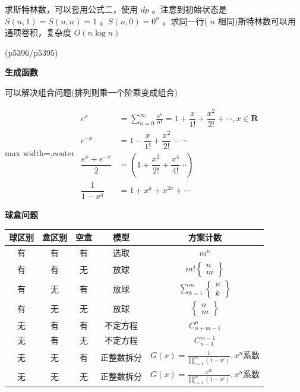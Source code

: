 \documentclass[twocolumn,10pt]{ctexart}
\makeatletter
\newcommand{\hfive}[1]{\par\addvspace{6pt}\@afterindentfalse
  {\noindent\bfseries\normalsize #1}\par\nobreak\vspace{2pt}}
\makeatother
\begin{document}
求斯特林数，可以套用公式二，使用 $dp$ 。注意到初始状态是$S(n,1)=S(n,n)=1$ 。$S(n,0)=0^n$ 。求同一行( $n$ 相同)斯特林数可以用通项卷积，复杂度 $O(n\log n)$

(p5396/p5395)

\hfive{生成函数}

可以解决组合问题(排列则乘一个阶乘变成组合)

\begin{adjustbox}{max width=\linewidth,center}
$\begin{aligned}
e^x&=\sum_{n=0}^\infty\frac{x^n}{n!}=1+\dfrac x{1!}+\dfrac{x^2}{2!}+\cdots,x\in\mathbf{R}
\\
e^{-x}&=1-\dfrac{x}{1!}+\dfrac{x^2}{2!}-\cdots
\\
\dfrac{e^x+e^{-x}}2&=(1+\dfrac{x^2}{2!}+\dfrac {x^4}{4!}\cdots)
\\
\dfrac1{1-x^a}&=1+x^a+x^{2a}+\cdots
\end{aligned}$
\end{adjustbox}

\hfive{球盒问题}

\begin{table}[t]
\centering
\small
\begin{tabular}{ccccc}
\toprule
球区别 & 盒区别 & 空盒 & 模型 & 方案计数 \\
\midrule
有 & 有 & 有 & 选取 & $m^n$ \\
有 & 有 & 无 & 放球 & $m!\left\{\begin{matrix}n\\m\end{matrix}\right\}$ \\
有 & 无 & 有 & 放球 & $\sum_{k=1}^m\left\{\begin{matrix}n\\k\end{matrix}\right\}$ \\
有 & 无 & 无 & 放球 & $\left\{\begin{matrix}n\\m\end{matrix}\right\}$ \\
无 & 有 & 有 & 不定方程 & $C_{n+m-1}^n$ \\
无 & 有 & 无 & 不定方程 & $C_{n-1}^{m-1}$ \\
无 & 无 & 有 & 正整数拆分 & $G(x)=\frac1{\prod_{i=1}^m(1-x^i)},\allowbreak{}x^n$系数 \\
无 & 无 & 无 & 正整数拆分 & $G(x)=\frac{x^m}{\prod_{i=1}^m(1-x^i)},\allowbreak{}x^n$系数 \\
\bottomrule
\end{tabular}
\end{table}
\end{document}
